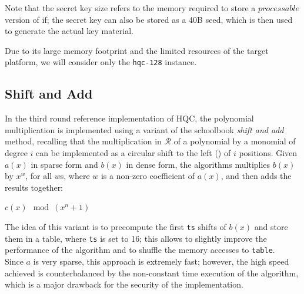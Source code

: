 Note that the secret key size refers to the memory required to store a $\textit{processable}$ version of if; the
secret key can also be stored as a 40B seed, which is then used to generate the actual key material.

Due to its large memory footprint and the limited resources of the target platform, we will consider only the \texttt{hqc-128} instance.


	\subsection{Shift and Add}\label{subsec:shift_add}
		In the third round reference implementation of HQC, the polynomial multiplication is implemented using a variant of the schoolbook
		\textit{shift and add} method, recalling that the multiplication in $\mathcal{R}$ of a polynomial by a monomial of degree $i$ 
		can be implemented as a circular shift to the left (\clshift) 	of $i$ positions. Given $a(x)$ in sparse form and $b(x)$ in dense form, the algorithms multiplies $b(x)$ by $x^w$, 
		for all $w$s, where $w$ is a non-zero coefficient of $a(x)$, and then adds the results together:

		\begin{algorithm2e}[H]
			\caption{Sparse-dense polynomial muktiplication}

			\KwRet $c(x) \mod (x^n+1)$\;
		\end{algorithm2e}
		The idea of this variant is to precompute the first \texttt{ts} shifts of $b(x)$ and store them in a table, where \texttt{ts} is set to 16;
		this allows to slightly improve the performance of the algorithm and to shuffle the memory accesses to \texttt{table}.\\
		Since $a$ is very sparse, this approach is extremely fast; however, the high speed achieved is counterbalanced by the
		non-constant time execution of the algorithm, which is a major drawback for the security of the implementation. 

